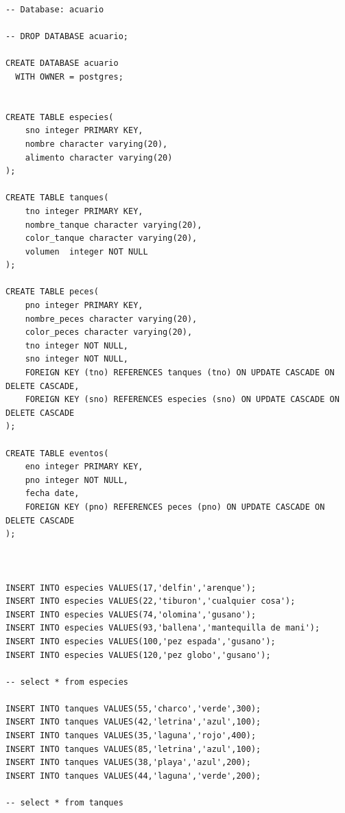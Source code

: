 \lstset{language=SQL}
   \vspace{-0.8cm}
\begin{lstlisting}[label=codigo1, caption=Ejemplo de SQL]
-- Database: acuario

-- DROP DATABASE acuario;

CREATE DATABASE acuario
  WITH OWNER = postgres;


CREATE TABLE especies(
    sno integer PRIMARY KEY,
    nombre character varying(20),
    alimento character varying(20)
);

CREATE TABLE tanques(
    tno integer PRIMARY KEY,
    nombre_tanque character varying(20),
    color_tanque character varying(20),
    volumen  integer NOT NULL
);

CREATE TABLE peces(
    pno integer PRIMARY KEY,
    nombre_peces character varying(20),
    color_peces character varying(20),
    tno integer NOT NULL,
    sno integer NOT NULL,
    FOREIGN KEY (tno) REFERENCES tanques (tno) ON UPDATE CASCADE ON DELETE CASCADE,
    FOREIGN KEY (sno) REFERENCES especies (sno) ON UPDATE CASCADE ON DELETE CASCADE
);

CREATE TABLE eventos(
    eno integer PRIMARY KEY,
    pno integer NOT NULL,
    fecha date,
    FOREIGN KEY (pno) REFERENCES peces (pno) ON UPDATE CASCADE ON DELETE CASCADE
);



INSERT INTO especies VALUES(17,'delfin','arenque');
INSERT INTO especies VALUES(22,'tiburon','cualquier cosa');
INSERT INTO especies VALUES(74,'olomina','gusano');
INSERT INTO especies VALUES(93,'ballena','mantequilla de mani');
INSERT INTO especies VALUES(100,'pez espada','gusano');
INSERT INTO especies VALUES(120,'pez globo','gusano');

-- select * from especies

INSERT INTO tanques VALUES(55,'charco','verde',300);
INSERT INTO tanques VALUES(42,'letrina','azul',100);
INSERT INTO tanques VALUES(35,'laguna','rojo',400);
INSERT INTO tanques VALUES(85,'letrina','azul',100);
INSERT INTO tanques VALUES(38,'playa','azul',200);
INSERT INTO tanques VALUES(44,'laguna','verde',200);

-- select * from tanques



\end{lstlisting}
